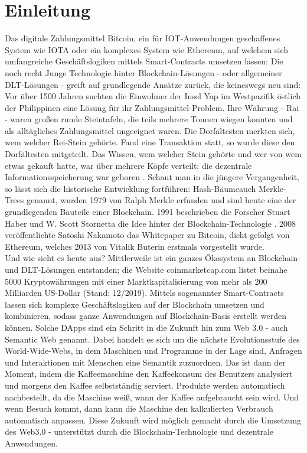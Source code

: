 \chapter{Einleitung}
\label{ch:intro}
Das digitale Zahlungsmittel Bitcoin, ein für \ac{IOT}-Anwen\-dungen geschaffenes System wie IOTA oder ein komplexes System wie Ethereum, auf welchem sich umfangreiche Geschäftslogiken mittels Smart-Contracts umsetzen lassen: Die noch recht Junge Technologie hinter Block\-chain-Lösungen - oder allgemeiner \ac{DLT}-Lösungen - greift auf grundlegende Ansätze zurück, die keineswegs neu sind:\\
Vor über 1500 Jahren suchten die Einwohner der Insel Yap im Westpazifik östlich der Philippinen eine Lösung für ihr Zahlungsmittel-Problem. Ihre Währung - Rai - waren großen runde Steintafeln, die teils mehrere Tonnen wiegen konnten und als alltägliches Zahlungsmittel ungeeignet waren. Die Dorfältesten merkten sich, wem welcher Rei-Stein gehörte. Fand eine Transaktion statt, so wurde diese den Dorfältesten mitgeteilt. Das Wissen, wem welcher Stein gehörte und wer von wem etwas gekauft hatte, war über mehrere Köpfe verteilt; die dezentrale Informationsspeicherung war geboren \cite{forbes2018}. Schaut man in die jüngere Vergangenheit, so lässt sich die historische Entwicklung fortführen: Hash-Bäumeauch Merkle-Trees genannt, wurden 1979 von Ralph Merkle erfunden und sind heute eine der grundlegenden Bauteile einer Blockchain. 1991 beschrieben die Forscher Stuart Haber und W. Scott Stornetta die Idee hinter der Blockchain-Technologie \cite{binance2019}. 2008 veröffentlichte Satoshi Nakamoto das Whitepaper zu Bitcoin, dicht gefolgt von Ethereum, welches 2013 von Vitalik Buterin erstmals vorgestellt wurde.\\
Und wie sieht es heute aus? Mittlerweile ist ein ganzes Ökosystem an Block\-chain- und \ac{DLT}-Lösungen entstanden; die Website coinmarketcap.com listet beinahe 5000 Kryptowährungen mit einer Marktkapitalisierung von mehr als 200 Milliarden US-Dollar (Stand: 12/2019). Mittels sogenannter Smart-Contracts lassen sich komplexe Geschäftslogiken auf der Blockchain umsetzen und kombinieren, sodass ganze Anwendungen auf Blockchain-Basis erstellt werden können. Solche \ac{DApp}s sind ein Schritt in die Zukunft hin zum Web 3.0 - auch Semantic Web genannt. Dabei handelt es sich um die nächste Evolutionsstufe des World-Wide-Webs, in dem Maschinen und Programme in der Lage sind, Anfragen und Interaktionen mit Menschen eine Semantik zuzuordnen. Das ist dann der Moment, indem die Kaffeemaschine den Kaffeekonsum des Benutzers analysiert und morgens den Kaffee selbstständig serviert. Produkte werden automatisch nachbestellt, da die Maschine weiß, wann der Kaffee aufgebraucht sein wird. Und wenn Besuch kommt, dann kann die Maschine den kalkulierten Verbrauch automatisch anpassen. Diese Zukunft wird möglich gemacht durch die Umsetzung des Web3.0 - unterstützt durch die Blockchain-Technologie und dezentrale Anwendungen.

